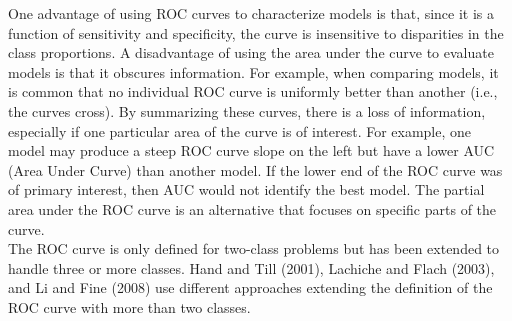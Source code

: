 \documentclass{article}%
\begin{document}
\indent One advantage of using ROC curves to characterize models is that, since it is a function of sensitivity and specificity, the curve is insensitive to disparities in the class proportions. A disadvantage of using the area under the curve to evaluate models is that it obscures
information. For example, when comparing models, it is common that no individual ROC curve is uniformly better than another (i.e., the curves cross). By summarizing these curves, there is a loss of information, especially if one particular area of the curve is of interest. For example, one model may produce a steep ROC curve slope on the left but have a lower AUC (Area Under Curve) than another model. If the lower end of the ROC curve was of primary interest, then AUC would not identify the best model. The partial area under the ROC curve is an alternative that focuses on specific parts of the curve.\\
\indent The ROC curve is only defined for two-class problems but has been extended to handle three or more classes. Hand and Till (2001), Lachiche and Flach (2003), and Li and Fine (2008) use different approaches extending the definition of the ROC curve with more than two classes.
\end{document}
